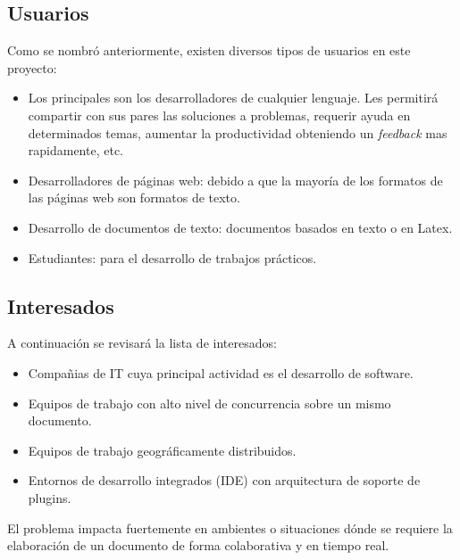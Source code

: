\documentclass[a4paper,11pt]{article}
\begin{document}
		\subsection{Usuarios}
		    Como se nombr\'o anteriormente, existen diversos tipos de usuarios en este proyecto:

		    \begin{itemize}
				\item 	Los principales son los desarrolladores de cualquier lenguaje. Les permitir\'a
						compartir con sus pares las soluciones a problemas, requerir ayuda en
						determinados temas, aumentar la productividad obteniendo un \textit{feedback} mas
						rapidamente, etc.

				\item 	Desarrolladores de p\'aginas web: debido a que la mayor\'ia de los formatos
						de las p\'aginas web son formatos de texto.

				\item	Desarrollo de documentos de texto: documentos basados en texto o en Latex.

				\item	Estudiantes: para el desarrollo de trabajos pr\'acticos.

		    \end{itemize}

		\subsection{Interesados}
		    A continuaci\'on se revisar\'a la lista de interesados:

		    \begin{itemize}
				\item 	Compa\~nias de IT cuya principal actividad es el desarrollo de software.

				\item 	Equipos de trabajo con alto nivel de concurrencia sobre un mismo documento.

				\item 	Equipos de trabajo geogr\'aficamente distribuidos.

				\item	Entornos de desarrollo integrados (IDE) con arquitectura de soporte de plugins.
		    \end{itemize}

		    El problema impacta fuertemente en ambientes o situaciones d\'onde se requiere
		    la elaboraci\'on de un documento de forma colaborativa y en tiempo real.
\end{document}
